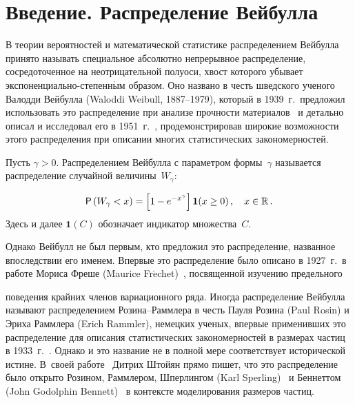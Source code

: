

      \thispagestyle{headings}

      \begin{multicols}{2}

            \label{st\stat}

\section{Введение. Распределение Вейбулла}


В теории вероятностей и математической статистике распределением
Вейбулла принято называть специальное абсолютно непрерывное
распределение, сосредоточенное на неотрицательной полуоси, хвост
которого убывает экс\-по\-нен\-ци\-аль\-но-сте\-пен\-н$\acute{\mbox{ы}}$м образом.
Оно названо в
честь шведского ученого Валодди Вейбулла (Waloddi Weibull,
1887--1979), который в 1939~г.\ предложил использовать это
распределение при анализе прочности материалов~\cite{Weibull1939a, Weibull1939b}
и детально описал и исследовал его в 1951~г.~\cite{Weibull1951},
продемонстрировав широкие возможности этого
распределения при описании многих статистических закономерностей.

Пусть $\gamma>0$. Распределением Вейбулла с параметром формы~$\gamma$
называется распределение случайной величины~$W_{\gamma}$:

\noindent
\begin{equation}
 {\sf P}\left(W_{\gamma}<x\right)=
 \left[1-e^{-x^{\gamma}}\right]\mathbf{1}(x\ge 0)\,,\ \ \ x\in\mathbb{R}\,.
 \label{e1-kor}
\end{equation}
Здесь и далее  $\mathbf{1}(C)$ обозначает индикатор множества~$C$.

Однако Вейбулл не был первым, кто предложил это распределение,
названное впоследствии его именем. Впервые это распределение было
описано в 1927~г.\ в работе Мориса Фреше (Maurice
Fr$\acute{\mbox{e}}$chet)~\cite{Frechet1927},
посвященной изучению предельного\linebreak\vspace*{-12pt}

\columnbreak

\noindent
 поведения
крайних членов вариационного ряда. Иногда распределение Вейбулла
называют распределением Розина--Раммлера в честь Пауля Розина (Paul
Rosin) и Эриха Раммлера (Erich Rammler), немецких ученых, впервые
применивших это распределение для описания статистических
закономерностей в размерах частиц в 1933~г.~\cite{RosinRammler1933}.
Однако и это название не в полной мере соответствует исторической
истине.
%
В~своей работе~\cite{Stoyan2013} Дитрих Штойян прямо пишет,
что это распределение было открыто Розином, Раммлером, Шперлингом
(Karl Sperling)~\cite{RosinRammler1933, RosinRammlerSperling1933} и
Беннеттом (John Godolphin Bennett)~\cite{Bennett1936} в контексте
моделирования размеров частиц. 


\end{multicols}

